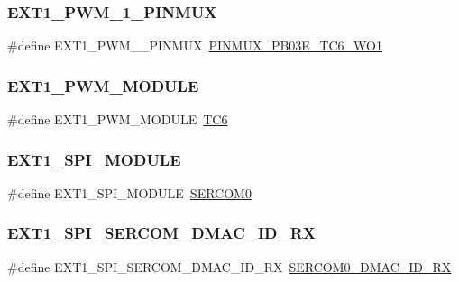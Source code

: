 \subsubsection{\texorpdfstring{EXT1\_PWM\_1\_PINMUX}{EXT1\_PWM\_1\_PINMUX}}
{\footnotesize\ttfamily \#define E\+X\+T1\+\_\+\+P\+W\+M\+\_\+\_\+\+P\+I\+N\+M\+UX~\mbox{\hyperlink{pio_2samd21j18a_8h_a703285f8061e59e447973eb6547be57c}{P\+I\+N\+M\+U\+X\+\_\+\+P\+B03\+E\+\_\+\+T\+C6\+\_\+\+W\+O1}}}

\mbox{\label{group__samd21__xplained__pro__features__group_ga17be406af2b3ea3f95811b573de0b4a8}} 
\subsubsection{\texorpdfstring{EXT1\_PWM\_MODULE}{EXT1\_PWM\_MODULE}}
{\footnotesize\ttfamily \#define E\+X\+T1\+\_\+\+P\+W\+M\+\_\+\+M\+O\+D\+U\+LE~\mbox{\hyperlink{group___s_a_m_d21_j18_a__base_gae5a1efa96ea067fb3907f342aa6fb0a4}{T\+C6}}}

\mbox{\label{group__samd21__xplained__pro__features__group_gaa2643abcb5f9bf242d4854055a250370}} 
\subsubsection{\texorpdfstring{EXT1\_SPI\_MODULE}{EXT1\_SPI\_MODULE}}
{\footnotesize\ttfamily \#define E\+X\+T1\+\_\+\+S\+P\+I\+\_\+\+M\+O\+D\+U\+LE~\mbox{\hyperlink{group___s_a_m_d21_j18_a__base_gae5473788457bad0e69ad9d7f22ed404f}{S\+E\+R\+C\+O\+M0}}}

\mbox{\label{group__samd21__xplained__pro__features__group_ga6bb390a4ffd62a13afbca383227b128f}} 
\subsubsection{\texorpdfstring{EXT1\_SPI\_SERCOM\_DMAC\_ID\_RX}{EXT1\_SPI\_SERCOM\_DMAC\_ID\_RX}}
{\footnotesize\ttfamily \#define E\+X\+T1\+\_\+\+S\+P\+I\+\_\+\+S\+E\+R\+C\+O\+M\+\_\+\+D\+M\+A\+C\+\_\+\+I\+D\+\_\+\+RX~\mbox{\hyperlink{sercom0_8h_ab5613175d987b32d775857976f6ab457}{S\+E\+R\+C\+O\+M0\+\_\+\+D\+M\+A\+C\+\_\+\+I\+D\+\_\+\+RX}}}

